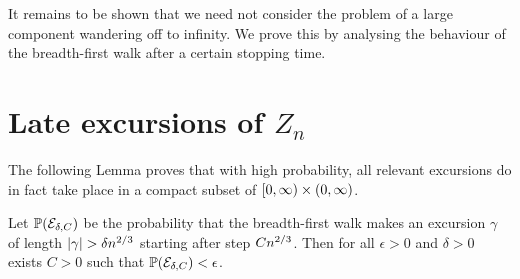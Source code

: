 
It remains to be shown that we need not consider the problem of a large component wandering off to infinity.
We prove this by analysing the behaviour of the breadth-first walk after a certain stopping time.

\section{Late excursions of $Z_n$}

The following Lemma proves that with high probability, all relevant excursions do in fact take place in a compact subset of $[0, \infty) \times (0, \infty)$.

\begin{lemma} \label{L: late excursions}
	Let 
	$\mathbb{P}(\mathcal{E}_{\delta, C})$ 
	be the probability that the breadth-first walk makes an excursion $\gamma$ of length 
	$|\gamma| > \delta n^{2 / 3}$ starting after step $Cn^{2 / 3}$.
	Then for all $\epsilon>0$ and $\delta > 0$ exists $C>0$ such that $\mathbb{P}(\mathcal{E}_{\delta, C}) < \epsilon$. 
\end{lemma}

